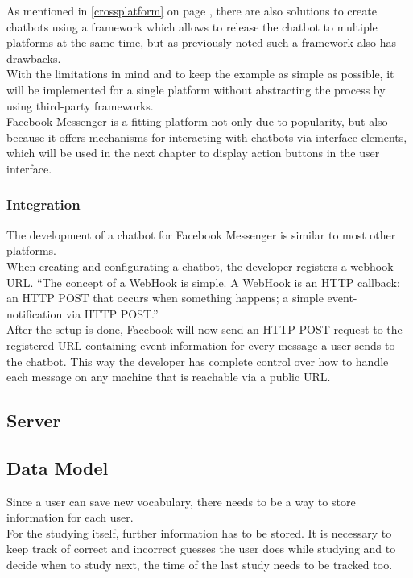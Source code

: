 As mentioned in \ref{crossplatform} on page \pageref{crossplatform}, there are also solutions to create chatbots using a framework which allows to release the chatbot to multiple platforms at the same time, but as previously noted such a framework also has drawbacks.
\\
With the limitations in mind and to keep the example as simple as possible,
it will be implemented for a single platform without abstracting the process by using third-party frameworks.
\\

Facebook Messenger is a fitting platform not only due to popularity,
but also because it offers mechanisms for interacting with chatbots via interface elements,
which will be used in the next chapter to display action buttons in the user interface.
\\

\subsubsection{Integration}
The development of a chatbot for Facebook Messenger is similar to most other platforms.
\\
When creating and configurating a chatbot, the developer registers a webhook URL.
``The concept of a WebHook is simple. A WebHook is an HTTP callback: an HTTP POST that occurs when something happens; a simple event-notification via HTTP POST.''\cite{webhook}
\\
After the setup is done,
Facebook will now send an HTTP POST request to the registered URL containing event information for every message a user sends to the chatbot.
This way the developer has complete control over how to handle each message on any machine that is reachable via a public URL.


\subsection{Server}

\subsection{Data Model}


Since a user can save new vocabulary,
there needs to be a way to store information for each user.
\\
For the studying itself, further information has to be stored.
It is necessary to keep track of correct and incorrect guesses the user does while studying
and to decide when to study next, the time of the last study needs to be tracked too.
\\

